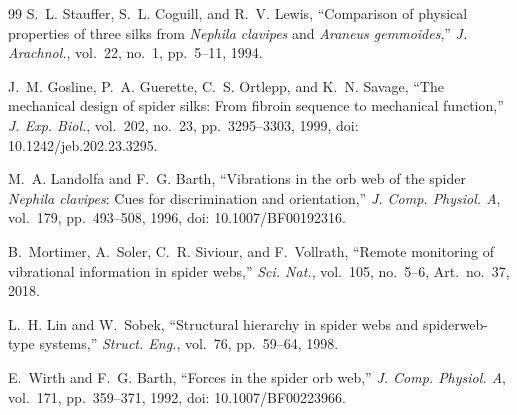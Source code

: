 \documentclass[11pt,letterpaper]{article}
\begin{document}
\begin{thebibliography}{99}
S.~L. Stauffer, S.~L. Coguill, and R.~V. Lewis,
``Comparison of physical properties of three silks from \textit{Nephila
clavipes} and \textit{Araneus gemmoides},'' \textit{J. Arachnol.}, vol.~22,
no.~1, pp.~5--11, 1994.

J.~M. Gosline, P.~A. Guerette, C.~S. Ortlepp, and K.~N. Savage,
``The mechanical design of spider silks: From fibroin sequence to mechanical
function,'' \textit{J. Exp. Biol.}, vol.~202, no.~23, pp.~3295--3303, 1999,
doi: 10.1242/jeb.202.23.3295.

M.~A. Landolfa and F.~G. Barth,
``Vibrations in the orb web of the spider \textit{Nephila clavipes}: Cues for
discrimination and orientation,'' \textit{J. Comp. Physiol. A}, vol.~179,
pp.~493--508, 1996, doi: 10.1007/BF00192316.

B.~Mortimer, A.~Soler, C.~R. Siviour, and F.~Vollrath,
``Remote monitoring of vibrational information in spider webs,''
\textit{Sci. Nat.}, vol.~105, no.~5--6, Art.~no.~37, 2018.

L.~H. Lin and W.~Sobek,
``Structural hierarchy in spider webs and spiderweb-type systems,''
\textit{Struct. Eng.}, vol.~76, pp.~59--64, 1998.

E.~Wirth and F.~G. Barth, ``Forces in the spider orb web,''
\textit{J. Comp. Physiol. A}, vol.~171, pp.~359--371, 1992,
doi: 10.1007/BF00223966.

\end{thebibliography}
\end{document}
